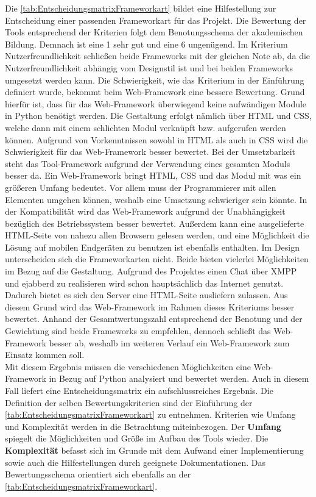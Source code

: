 \documentclass[a4paper,titlepage,halfparskip,12pt]{scrreprt}
\begin{document}
\begin{onehalfspacing}
Die \autoref{tab:EntscheidungsmatrixFrameworkart} bildet eine Hilfestellung zur Entscheidung einer passenden Frameworkart für das Projekt. Die Bewertung der Tools entsprechend der Kriterien folgt dem Benotungsschema der akademischen Bildung. Demnach ist eine 1 sehr gut und eine 6 ungenügend. Im Kriterium Nutzerfreundlichkeit schließen beide Frameworks mit der gleichen Note ab, da die Nutzerfreundlichkeit abhängig vom Designstil ist und bei beiden Frameworks umgesetzt werden kann. Die Schwierigkeit, wie das Kriterium in der Einführung definiert wurde, bekommt beim Web-Framework eine bessere Bewertung. Grund hierfür ist, dass für das Web-Framework überwiegend keine aufwändigen Module in Python benötigt werden. Die Gestaltung erfolgt nämlich über HTML und CSS, welche dann mit einem schlichten Modul verknüpft bzw. aufgerufen werden können. Aufgrund von Vorkenntnissen sowohl in HTML als auch in CSS wird die Schwierigkeit für das Web-Framework besser bewertet. Bei der Umsetzbarkeit steht das Tool-Framework aufgrund der Verwendung eines gesamten Moduls besser da. Ein Web-Framework bringt HTML, CSS und das Modul mit was ein größeren Umfang bedeutet. Vor allem muss der Programmierer mit allen Elementen umgehen können, weshalb eine Umsetzung schwieriger sein könnte. In der Kompatibilität wird das Web-Framework aufgrund der Unabhängigkeit bezüglich des Betriebssystem besser bewertet. Außerdem kann eine ausgelieferte HTML-Seite von nahezu allen Browsern gelesen werden, und eine Möglichkeit die Lösung auf mobilen Endgeräten zu benutzen ist ebenfalls enthalten. Im Design unterscheiden sich die Frameworkarten nicht. Beide bieten vielerlei Möglichkeiten im Bezug auf die Gestaltung. Aufgrund des Projektes einen Chat über \ac{XMPP} und ejabberd zu realisieren wird schon hauptsächlich das Internet genutzt. Dadurch bietet es sich den Server eine HTML-Seite ausliefern zulassen. Aus diesem Grund wird das Web-Framework im Rahmen dieses Kriteriums besser bewertet. Anhand der Gesamtwertungszahl entsprechend der Benotung und der Gewichtung sind beide Frameworks zu empfehlen, dennoch schließt das Web-Framework besser ab, weshalb im weiteren Verlauf ein Web-Framework zum Einsatz kommen soll. \cite{FrameworkOverview} \cite{WebFramework}\\
Mit diesem Ergebnis müssen die verschiedenen Möglichkeiten eine Web-Framework in Bezug auf Python analysiert und bewertet werden. Auch in diesem Fall liefert eine Entscheidungsmatrix ein aufschlussreiches Ergebnis. Die Definition der selben Bewertungskriterien sind der Einführung der \autoref{tab:EntscheidungsmatrixFrameworkart} zu entnehmen. Kriterien wie Umfang und Komplexität werden in die Betrachtung miteinbezogen. Der \textbf{Umfang} spiegelt die Möglichkeiten und Größe im Aufbau des Tools wieder. Die \textbf{Komplexität} befasst sich im Grunde mit dem Aufwand einer Implementierung sowie auch die Hilfestellungen durch geeignete Dokumentationen. Das Bewertungsschema orientiert sich ebenfalls an der \autoref{tab:EntscheidungsmatrixFrameworkart}.\\

\end{onehalfspacing}
\end{document}
